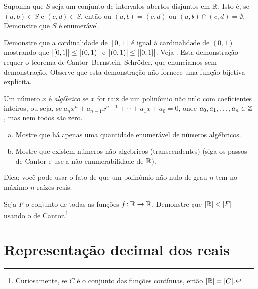 \begin{exercise}
Suponha que $S$ seja um conjunto de intervalos abertos disjuntos em ${\mathbb{R}}$. Isto é,
se $(a,b) \in S$ e $(c,d) \in S$, então ou $(a,b) = (c,d)$
ou $(a,b) \cap (c,d) = \emptyset$. Demonstre que $S$ é enumerável.
\end{exercise}

\begin{exercise}
Demonstre que a cardinalidade de $[0,1]$ é igual à cardinalidade de
$(0,1)$ mostrando que
$\bigl\lvert {[0,1]} \bigr\rvert \leq \bigl\lvert {(0,1)} \bigr\rvert$ e
$\bigl\lvert {(0,1)} \bigr\rvert \leq \bigl\lvert {[0,1]} \bigr\rvert$.
Veja .
Esta demonstração requer o teorema de Cantor--Bernstein--Schr\"oder, que
enunciamos sem demonstração. Observe que esta demonstração não fornece
uma função bijetiva explícita.
\end{exercise}

\begin{exercise}[Desafiador]
Um número $x$ é \emph{algébrico} se $x$ for raiz de
um polinômio não nulo com
coeficientes inteiros, ou seja, se $a_n x^n + a_{n-1} x^{n-1} + \cdots
+ a_1 x + a_0 = 0$, onde $a_0,a_1,\ldots,a_n \in {\mathbb{Z}}$, mas nem todos são zero.
\begin{enumerate}[a)]
\item
Mostre que há apenas
uma quantidade enumerável de números algébricos.
\item
Mostre que existem números não algébricos (transcendentes)
(siga os passos de Cantor e use a não enumerabilidade de ${\mathbb{R}}$).
\end{enumerate}
Dica: você pode usar o fato de que um polinômio não nulo de grau $n$ tem no máximo $n$ raízes
reais.
\end{exercise}

\begin{exercise}[Desafiador]
Seja $F$ o conjunto de todas as funções $f \colon {\mathbb{R}} \to {\mathbb{R}}$.
Demonstre que $\lvert {{\mathbb{R}}} \rvert < \lvert {F} \rvert$
usando o  de Cantor.\footnote{Curiosamente,
se $C$ é o conjunto das funções contínuas, então $\lvert {{\mathbb{R}}} \rvert = \lvert {C} \rvert$.}
\end{exercise}


\sectionnewpage

\section{Representação decimal dos reais}
\label{sec:decimals}

